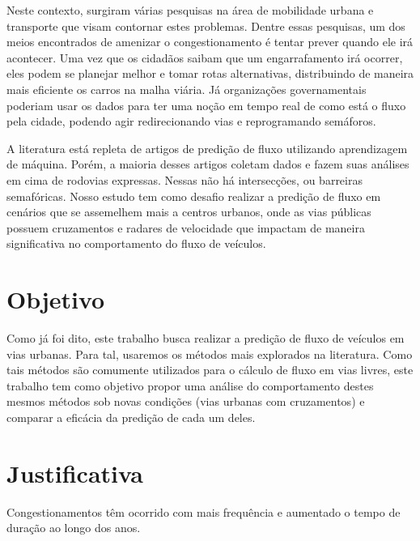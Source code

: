 Neste contexto, surgiram várias pesquisas na área de mobilidade urbana e transporte que visam contornar estes problemas. Dentre essas pesquisas, um dos meios encontrados de amenizar o congestionamento é tentar prever quando ele irá acontecer. Uma vez que os cidadãos saibam que um engarrafamento irá ocorrer, eles podem se planejar melhor e tomar rotas alternativas, distribuindo de maneira mais eficiente os carros na malha viária. Já organizações governamentais poderiam usar os dados para ter uma noção em tempo real de como está o fluxo pela cidade, podendo agir redirecionando vias e reprogramando semáforos.

A literatura está repleta de artigos de predição de fluxo utilizando aprendizagem de máquina. Porém, a maioria desses artigos coletam dados e fazem suas análises em cima de rodovias expressas. Nessas não há intersecções, ou barreiras semafóricas. Nosso estudo tem como desafio realizar a predição de fluxo em cenários que se assemelhem mais a centros urbanos, onde as vias públicas possuem cruzamentos e radares de velocidade que impactam de maneira significativa no comportamento do fluxo de veículos.

\section{Objetivo}

Como já foi dito, este trabalho busca realizar a predição de fluxo de veículos em vias urbanas. Para tal, usaremos os métodos mais explorados na literatura. Como tais métodos são comumente utilizados para o cálculo de fluxo em vias livres, este trabalho tem como objetivo propor uma análise do comportamento destes mesmos métodos sob novas condições (vias urbanas com cruzamentos) e comparar a eficácia da predição de cada um deles.
 
\section{Justificativa}



Congestionamentos têm ocorrido com mais frequência e aumentado o tempo de duração ao longo dos anos. 


